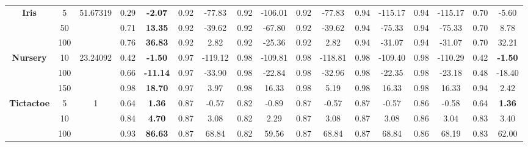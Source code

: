 \documentclass[letterpaper]{article}
\theoremstyle{definition}
\begin{document}
\begin{table}[h]
\begin{tabular}{|c|c|c|c|c|c|c|c|c|c|c|c|c|c|c|c|c|}
\multirow{3}{*}{\textbf{Iris}}      & 5        & 51.67319 & 0.29  & \textbf{-2.07}   & 0.92  & -77.83           & 0.92   & -106.01           & 0.92      & -77.83       & 0.94  & -115.17          & 0.94     & -115.17            & 0.70   & -5.60            \\ \cline{2-17} 
                                    & 50       &          & 0.71  & \textbf{13.35}   & 0.92  & -39.62           & 0.92   & -67.80            & 0.92      & -39.62       & 0.94  & -75.33           & 0.94     & -75.33             & 0.70   & 8.78             \\ \cline{2-17} 
                                    & 100      &          & 0.76  & \textbf{36.83}   & 0.92  & 2.82             & 0.92   & -25.36            & 0.92      & 2.82         & 0.94  & -31.07           & 0.94     & -31.07             & 0.70   & 32.21            \\ \hline
\multirow{3}{*}{\textbf{Nursery}}   & 10       & 23.24092 & 0.42  & \textbf{-1.50}   & 0.97      & -119.12      & 0.98   & -109.81           & 0.98      & -118.81      & 0.98      & -109.40      & 0.98         & -110.29        & 0.42   & \textbf{-1.50}   \\ \cline{2-17} 
                                    & 100      &          & 0.66  & \textbf{-11.14}  & 0.97      & -33.90       & 0.98   & -22.84            & 0.98      & -32.96       & 0.98      & -22.35       & 0.98         & -23.18         & 0.48   & -18.40           \\ \cline{2-17} 
                                    & 150      &          & 0.98  & \textbf{18.70}   & 0.97      & 3.97         & 0.98   & 16.33             & 0.98      & 5.19         & 0.98      & 16.33        & 0.98         & 16.33          & 0.94   & 2.42             \\ \hline
\multirow{3}{*}{\textbf{Tictactoe}} & 5        & 1        & 0.64  & \textbf{1.36}    & 0.87  & -0.57            & 0.82   & -0.89             & 0.87      & -0.57        & 0.87  & -0.57            & 0.86     & -0.58              & 0.64   & \textbf{1.36}    \\ \cline{2-17} 
                                    & 10       &          & 0.84  & \textbf{4.70}    & 0.87  & 3.08             & 0.82   & 2.29              & 0.87      & 3.08         & 0.87  & 3.08             & 0.86     & 3.04               & 0.83   & 3.40             \\ \cline{2-17} 
                                    & 100      &          & 0.93  & \textbf{86.63}   & 0.87  & 68.84            & 0.82   & 59.56             & 0.87      & 68.84        & 0.87  & 68.84            & 0.86     & 68.19              & 0.83   & 62.00            \\ \hline

\end{tabular}
\end{table}
\end{document}
